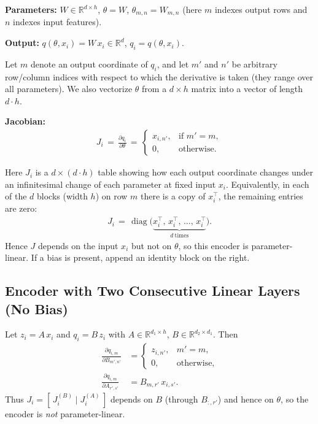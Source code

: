 \textbf{Parameters:} $W\in\mathbb{R}^{d\times h}$, \;$\theta=W$, \;$\theta_{m,n}=W_{m,n}$ \;(here $m$ indexes output rows and $n$ indexes input features).

\textbf{Output:} $q(\theta,x_i)=W\,x_i\in\mathbb{R}^{d}$, \;$q_i=q(\theta,x_i)$.

Let $m$ denote an output coordinate of $q_i$, and let $m'$ and $n'$ be arbitrary row/column indices with respect to which the derivative is taken (they range over all parameters). We also vectorize $\theta$ from a $d\!\times\!h$ matrix into a vector of length $d\!\cdot\!h$.

\textbf{Jacobian:}
\begin{align}
J_i \,=\, \frac{\partial q_i}{\partial \theta} \,=\, \begin{cases}
x_{i,n'}, & \text{if } m' = m,\\
0, & \text{otherwise.}
\end{cases}
\end{align}

Here $J_i$ is a $d \times (d\!\cdot\! h)$ table showing how each output coordinate changes under an infinitesimal change of each parameter at fixed input $x_i$. Equivalently, in each of the $d$ blocks (width $h$) on row $m$ there is a copy of $x_i^{\!\top}$, the remaining entries are zero:
\begin{align}
J_i \,=\, \operatorname{diag}\!\bigl(\underbrace{x_i^{\!\top},\, x_i^{\!\top},\, \dots,\, x_i^{\!\top}}_{d\ \text{times}}\bigr) .
\end{align}
Hence $J$ depends on the input $x_i$ but not on $\theta$, so this encoder is parameter-linear. If a bias is present, append an identity block on the right.

\subsection{Encoder with Two Consecutive Linear Layers (No Bias)}\label{app:two-linear}
Let $z_i = A\,x_i$ and $q_i = B\,z_i$ with $A\in\mathbb{R}^{d_1\times h}$, $B\in\mathbb{R}^{d_2\times d_1}$. Then
\begin{align}
\frac{\partial q_{i,m}}{\partial B_{m',n'}} &= \begin{cases} z_{i,n'}, & m'=m, \\ 0, & \text{otherwise,} \end{cases} \\
\frac{\partial q_{i,m}}{\partial A_{r',s'}} &= B_{m,r'}\,x_{i,s'}.
\end{align}
Thus $J_i = [\, J^{(B)}_i \mid J^{(A)}_i \,]$ depends on $B$ (through $B_{:,r'}$) and hence on $\theta$, so the encoder is \emph{not} parameter-linear.

